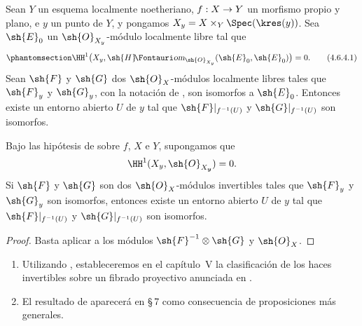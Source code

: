 \documentclass[oneside]{amsart}
\makeatletter
\newcommand{\ega@arrow}[2]{\mathchoice{#1}{#2}{#2}{#2}}
\renewcommand{\to}{\ega@arrow{\longrightarrow}{\rightarrow}}
\newcommand*{\ega@sheafop}[3]{\sh{#1}#2\textup{\kern-2.2pt{\Fontauri\slshape #3}}}
\newcommand*{\shHom}{\ega@sheafop{H}{}{om}}
\let\EGAOriginalLabel\label
\renewcommand{\label}[1]{\phantomsection\EGAOriginalLabel{#1}}
\makeatother
\begin{document}
\begin{corollary}[4.6.4]
\label{III.4.6.4}
Sean $Y$ un esquema localmente noetheriano, $f:X\to Y$ un
morfismo propio y plano, e $y$ un punto de $Y$, y pongamos
$X_y=X\times_Y\Spec(\kres(y))$. Sea $\sh{E}_0$ un
$\sh{O}_{X_y}$-módulo localmente libre tal que
\[
\label{III.4.6.4.1}
  \HH^1\bigl(
    X_y,\shHom_{\sh{O}_{X_y}}(\sh{E}_0,\sh{E}_0)
  \bigr)=0.
  \tag{4.6.4.1}
\]
Sean $\sh{F}$ y $\sh{G}$ dos $\sh{O}_X$-módulos localmente libres
tales que $\sh{F}_y$ y $\sh{G}_y$, con la notación de
, son isomorfos a $\sh{E}_0$. Entonces existe un
entorno abierto $U$ de $y$ tal que
$\sh{F}|_{f^{-1}(U)}$ y $\sh{G}|_{f^{-1}(U)}$ son isomorfos.
\end{corollary}

\begin{corollary}[4.6.5]
\label{III.4.6.5}
Bajo las hipótesis de  sobre $f$, $X$ e $Y$,
supongamos que
\[
  \HH^1(X_y,\sh{O}_{X_{\boldsymbol y}})=0.
\]
Si $\sh{F}$ y $\sh{G}$ son dos $\sh{O}_X$-módulos invertibles tales
que $\sh{F}_y$ y $\sh{G}_y$ son isomorfos, entonces existe un entorno
abierto $U$ de $y$ tal que $\sh{F}|_{f^{-1}(U)}$ y
$\sh{G}|_{f^{-1}(U)}$ son isomorfos.
\end{corollary}

\begin{proof}
Basta aplicar  a los módulos
$\sh{F}^{-1}\otimes\sh{G}$ y $\sh{O}_X$.
\end{proof}

\begin{remarks}[4.6.6]
\label{III.4.6.6}
\begin{enumerate}
\item[(i)] Utilizando , estableceremos en el capítulo~V
  la clasificación de los haces invertibles sobre un fibrado proyectivo
  anunciada en .
\item[(ii)] El resultado de  aparecerá en \S\,7 como
  consecuencia de proposiciones más generales.
\end{enumerate}
\end{remarks}
\end{document}
